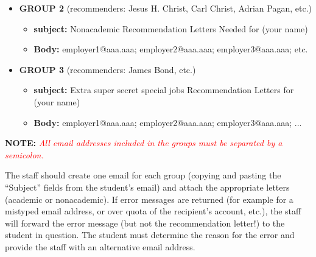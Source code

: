 \documentclass{\econtex}
\begin{document}
\begin{enumerate}
\begin{itemize}
  \item \textbf{ GROUP 2} (recommenders: Jesus H. Christ, Carl Christ, Adrian Pagan, etc.)
    \begin{itemize}
    \item \textbf{ subject:} Nonacademic Recommendation Letters Needed for (your name)
    \item \textbf{ Body:} employer1@aaa.aaa; employer2@aaa.aaa; employer3@aaa.aaa; etc.
    \end{itemize}

  \item \textbf{ GROUP 3} (recommenders: James Bond, etc.)
    \begin{itemize}
    \item \textbf{ subject:} Extra super secret special jobs Recommendation Letters for (your name)
    \item \textbf{ Body:} employer1@aaa.aaa; employer2@aaa.aaa; employer3@aaa.aaa; ...
    \end{itemize}
  \end{itemize}

  \textbf{NOTE:} \textcolor{red}{\textit{All email addresses included in the groups must be separated by a semicolon.}}

  \normalsize

  The staff should create one email for each group (copying and pasting
  the ``Subject'' fields from the student's email) and attach
  the appropriate letters (academic or nonacademic).  If error
  messages are returned (for example for a mistyped email address, or
  over quota of the recipient's account, etc.), the staff will forward
  the error message (but not the recommendation letter!) to the student
  in question. The student must determine the reason for the error and
  provide the staff with an alternative email address.



\end{enumerate}
\end{document}
